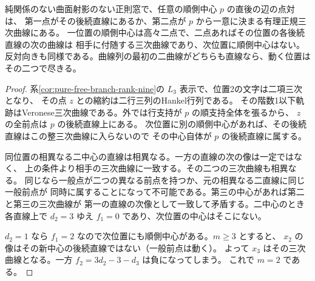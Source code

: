 \begin{proposition}\label{prop:pure-free-branch-cubic}
純関係のない曲面射影のない正則窓で、任意の順側中心 $p$ の直後の辺の点対は、
第一点がその後続直線にあるか、第二点が $p$ から一意に決まる有理正規三次曲線にある。
一位置の順側中心は高々二点で、二点あればその位置の各後続直線の次の曲線は
相手に付随する三次曲線であり、次位置に順側中心はない。
反対向きも同様である。曲線列の最初の二曲線がどちらも直線なら、動く位置はその二つで尽きる。
\end{proposition}
\begin{proof}
系\ref{cor:pure-free-branch-rank-nine}の $L_3$ 表示で、位置2の文字は二項三次となり、
その点 $z$ との縮約は二行三列のHankel行列である。
その階数1以下軌跡はVeronese三次曲線である。外では行支持が $p$ の順支持全体を張るから、
$z$ の全前点は $p$ の後続直線上にある。
次位置に別の順側中心があれば、その後続直線はこの整三次曲線に入らないので
その中心自体が $p$ の後続直線に属する。

同位置の相異なる二中心の直線は相異なる。一方の直線の次の像は一定ではなく、
上の条件より相手の三次曲線に一致する。その二つの三次曲線も相異なる。
同じなら一般点が二つの異なる前点を持つか、元の相異なる二直線に同じ一般前点が
同時に属することになって不可能である。第三の中心があれば第二と第三の三次曲線が
第一の直線の次像として一致して矛盾する。二中心のとき各直線上で $d_2=3$ ゆえ
$f_1=0$ であり、次位置の中心はそこにない。

$d_2=1$ なら $f_1=2$ なので次位置にも順側中心がある。$m\ge3$ とすると、
$x_2$ の像はその新中心の後続直線ではない（一般前点は動く）。
よって $x_3$ はその三次曲線となる。一方 $f_2=3d_2-3-d_3$ は負になってしまう。
これで $m=2$ である。
\end{proof}

